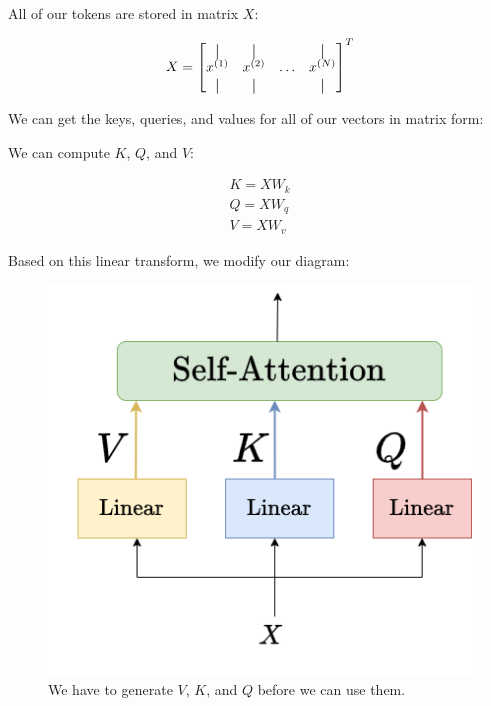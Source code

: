 
        All of our tokens are stored in matrix $X$:

        \begin{equation}
            X = 
            \begin{bmatrix}
                \vertbar & \vertbar  & \     & \vertbar \\
                \ex{x}{1} & \ex{x}{2} & \ldots & \ex{x}{N} \\
                \vertbar & \vertbar  &        & \vertbar
            \end{bmatrix}^T
        \end{equation}

        We can get the keys, queries, and values for all of our vectors in matrix form:\\

        \begin{kequation}
            We can compute $K$, $Q$, and $V$:

            $$
            \begin{matrix}
                K = XW_k \\
                Q = XW_q \\ 
                V = XW_v 
            \end{matrix}$$
        \end{kequation}

        Based on this linear transform, we modify our diagram:

        \begin{figure}[H]
            \centering
            \includegraphics[width=0.3\linewidth]{images/transformers_images/linear_VKQ.png}
            \caption*{We have to generate $V$, $K$, and $Q$ before we can use them.}
        \end{figure}

